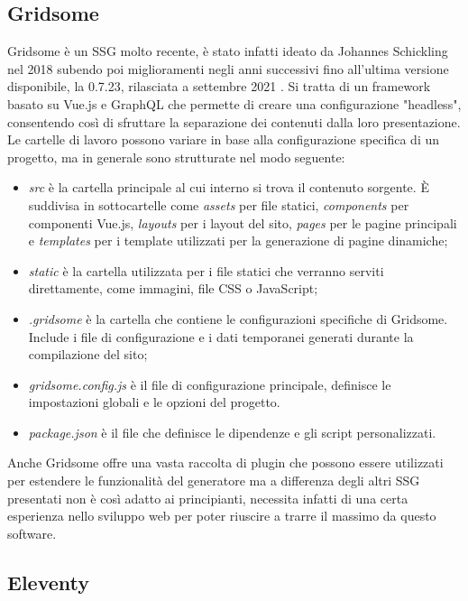 \documentclass[target=bach,aauheader=]{thud}
\begin{document}
\subsection{Gridsome}
Gridsome è un SSG molto recente, è stato infatti ideato da Johannes Schickling nel 2018 subendo poi miglioramenti negli anni successivi fino all'ultima versione disponibile, la 0.7.23, rilasciata a settembre 2021 \cite{gridsome-site}.
Si tratta di un framework basato su Vue.js e GraphQL che permette di creare una configurazione "headless", consentendo così di sfruttare la separazione dei contenuti dalla loro presentazione.
Le cartelle di lavoro possono variare in base alla configurazione specifica di un progetto, ma in generale sono strutturate nel modo seguente:

\begin{itemize}
    \item \textit{src} è la cartella principale al cui interno si trova il contenuto sorgente. È suddivisa in sottocartelle come \textit{assets} per file statici, \textit{components} per componenti Vue.js, \textit{layouts} per i layout del sito, \textit{pages} per le pagine principali e \textit{templates} per i template utilizzati per la generazione di pagine dinamiche;
    \item \textit{static} è la cartella utilizzata per i file statici che verranno serviti direttamente, come immagini, file CSS o JavaScript;
    \item \textit{.gridsome} è la cartella che contiene le configurazioni specifiche di Gridsome. Include i file di configurazione e i dati temporanei generati durante la compilazione del sito;
    \item \textit{gridsome.config.js} è il file di configurazione principale, definisce le impostazioni globali e le opzioni del progetto.
    \item \textit{package.json} è il file che definisce le dipendenze e gli script personalizzati.
\end{itemize}
Anche Gridsome offre una vasta raccolta di plugin che possono essere utilizzati per estendere le funzionalità del generatore ma a differenza degli altri SSG presentati non è così adatto ai principianti, necessita infatti di una certa esperienza nello sviluppo web per poter riuscire a trarre il massimo da questo software.

\subsection{Eleventy}
\end{document}
